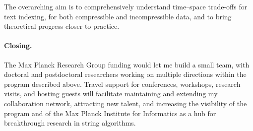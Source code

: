 \documentclass[a4paper,11pt]{article}
\begin{document}
The overarching aim is to comprehensively understand time--space trade-offs for text indexing, for both compressible and incompressible data, and to bring theoretical progress closer to practice.

\paragraph*{Closing.}

The Max Planck Research Group funding would let me build a small team, with doctoral and postdoctoral researchers working on multiple directions within the program described above. 
Travel support for conferences, workshops, research visits, and hosting guests will facilitate maintaining and extending my collaboration network, attracting new talent, and increasing the visibility of the program and of the Max Planck Institute for Informatics as a hub for breakthrough research in string algorithms.

\singlespacing 
\let\oldthebibliography\thebibliography
\let\endoldthebibliography\endthebibliography
\renewenvironment{thebibliography}[1]{\small
  \begin{oldthebibliography}{#1}
    \setlength{\itemsep}{0em}
    \setlength{\parskip}{0em}
}
{
  \end{oldthebibliography}
}

{ 

 
}
\end{document}
